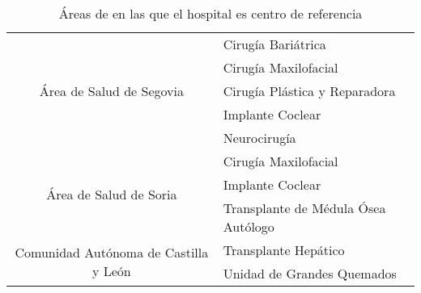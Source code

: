 \begin{table}
\begin{tabular}{cl}
        \midrule
        \multirow{5}{*}{Área de Salud de   Segovia}              & Cirugía Bariátrica                   \\
                                                                 & Cirugía Maxilofacial                 \\
                                                                 & Cirugía Plástica y Reparadora        \\
                                                                 & Implante Coclear                     \\
                                                                 & Neurocirugía                         \\
        \midrule
        \multirow{3}{*}{Área de Salud de   Soria}                & Cirugía Maxilofacial                 \\
                                                                 & Implante Coclear                     \\
                                                                 & Transplante de Médula Ósea Autólogo  \\
        \midrule
        \multirow{2}{*}{Comunidad Autónoma   de Castilla y León} & Transplante Hepático                 \\
                                                                 & Unidad de Grandes Quemados           \\
        \bottomrule
    \end{tabular}
    \caption{Áreas de en las que el hospital es centro de referencia}
\end{table}